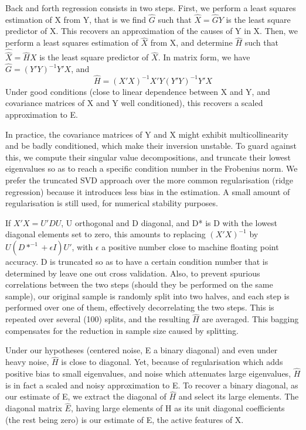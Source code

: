 \documentclass{article}
\begin{document}
Back and forth regression consists in two steps.
%
First, we perform a least squares estimation of X from Y, that is we find $\hat G$ such that $\hat X=\hat G Y$ is the least square predictor of X.
%
This recovers an approximation of the causes of Y in X.
%
Then, we perform a least squares estimation of $\hat X$ from X, and determine $\hat H$ such that $\hat {\hat X}=\hat H X$ is the least square predictor of $\hat X$.
%
In matrix form, we have $\hat G=(Y'Y)^{-1} Y'X$, and
\begin{equation} \hat H=(X'X)^{-1} X'Y(Y'Y)^{-1} Y'X\end{equation}
Under good conditions (close to linear dependence between X and Y, and covariance matrices of X and Y well conditioned), this recovers a scaled approximation to E.

In practice, the covariance matrices of Y and X might exhibit multicollinearity and be badly conditioned, which make their inversion unstable. To guard against this, we compute their singular value decompositions, and truncate their lowest eigenvalues so as to reach a specific condition number in the Frobenius norm. We prefer the truncated SVD approach over the more common regularisation (ridge regression) because it introduces less bias in the estimation. A small amount of regularisation is still used, for numerical stability purposes.

If $X'X=U'DU$, U orthogonal and D diagonal, and D* is D with the lowest diagonal elements set to zero, this amounts to replacing $(X'X)^{-1}$ by $U(D*^{-1}+\epsilon I)U'$, with $\epsilon$ a positive number close to machine floating point accuracy. D is truncated so as to have a certain condition number that is determined by leave one out cross validation.
%
Also, to prevent spurious correlations between the two steps (should they be performed on the same sample), our original sample is randomly split into two halves, and each step is performed over one of them, effectively decorrelating the two steps.
%
This is repeated over several (100) splits, and the resulting $\hat H$ are averaged.
%
This bagging compensates for the reduction in sample size caused by splitting.

Under our hypotheses (centered noise, E a binary diagonal) and even under heavy noise, $\hat H$ is close to diagonal.
%
Yet, because of regularisation which adds positive bias to small eigenvalues, and noise which attenuates large eigenvalues, $\hat H$ is in fact a scaled and noisy approximation to E.
%
To recover a binary diagonal, as our estimate of E, we extract the diagonal of $\hat H$ and select its large elements.
%
The diagonal matrix $\hat E$, having large elements of H as its unit diagonal coefficients (the rest being zero) is our estimate of E, the active features of X.
\end{document}
